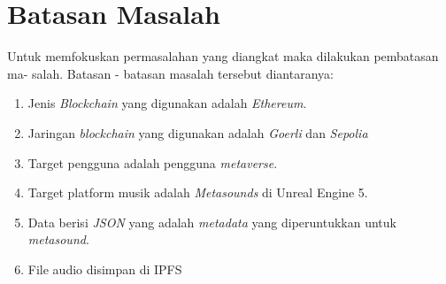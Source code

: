 \section{Batasan Masalah}
\label{sec:batasanmasalah}

Untuk memfokuskan permasalahan yang diangkat maka dilakukan pembatasan ma-
salah. Batasan - batasan masalah tersebut diantaranya:
\begin{enumerate}
  \item Jenis \emph{Blockchain} yang digunakan adalah \emph{Ethereum}.
  \item Jaringan \emph{blockchain} yang digunakan adalah \emph{Goerli} dan \emph{Sepolia}
  \item Target pengguna adalah pengguna \emph{metaverse}.
  \item Target platform musik adalah \emph{Metasounds} di Unreal Engine 5.
  \item Data berisi \emph{JSON} yang adalah \emph{metadata} yang diperuntukkan untuk \emph{metasound}.
  \item File audio disimpan di IPFS
\end{enumerate}

